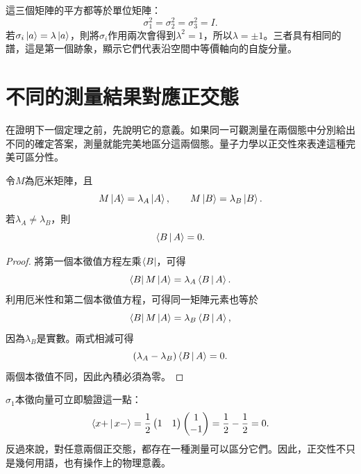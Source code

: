 這三個矩陣的平方都等於單位矩陣：
\begin{equation}
  \sigma_1^2=\sigma_2^2=\sigma_3^2=I.
  \label{eq:l03-pauli-squares}
\end{equation}
若\(\sigma_i\left\lvert a\right\rangle=\lambda\left\lvert a\right\rangle\)，則將\(\sigma_i\)作用兩次會得到\(\lambda^2=1\)，所以\(\lambda=\pm1\)。三者具有相同的譜，這是第一個跡象，顯示它們代表沿空間中等價軸向的自旋分量。

\section{不同的測量結果對應正交態}

在證明下一個定理之前，先說明它的意義。如果同一可觀測量在兩個態中分別給出不同的確定答案，測量就能完美地區分這兩個態。量子力學以正交性來表達這種完美可區分性。

\begin{theorem}
令\(M\)為厄米矩陣，且
\begin{equation}
  M\left\lvert A\right\rangle=\lambda_A\left\lvert A\right\rangle,
  \qquad
  M\left\lvert B\right\rangle=\lambda_B\left\lvert B\right\rangle.
\end{equation}
若\(\lambda_A\ne\lambda_B\)，則
\begin{equation}
  \left\langle B\,\middle|\,A\right\rangle=0.
\end{equation}
\end{theorem}

\begin{proof}
將第一個本徵值方程左乘\(\left\langle B\right\rvert\)，可得
\begin{equation}
  \left\langle B\right\rvert M\left\lvert A\right\rangle=\lambda_A\left\langle B\,\middle|\,A\right\rangle.
\end{equation}
利用厄米性和第二個本徵值方程，可得同一矩陣元素也等於
\begin{equation}
  \left\langle B\right\rvert M\left\lvert A\right\rangle=\lambda_B\left\langle B\,\middle|\,A\right\rangle,
\end{equation}
因為\(\lambda_B\)是實數。兩式相減可得
\begin{equation}
  (\lambda_A-\lambda_B)\left\langle B\,\middle|\,A\right\rangle=0.
\end{equation}
兩個本徵值不同，因此內積必須為零。
\end{proof}

\(\sigma_1\)本徵向量可立即驗證這一點：
\begin{equation}
  \left\langle x+\,\middle|\,x-\right\rangle
  =
  \frac12
  \begin{pmatrix}1&1\end{pmatrix}
  \begin{pmatrix}1\\-1\end{pmatrix}
  =\frac12-\frac12=0.
\end{equation}
反過來說，對任意兩個正交態，都存在一種測量可以區分它們。因此，正交性不只是幾何用語，也有操作上的物理意義。

